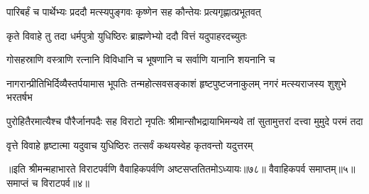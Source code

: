 \twolineshloka
{पारिबर्हं च पार्थेभ्यः प्रददौ मत्स्यपुङ्गवः}
{कृष्णेन सह कौन्तेयः प्रत्यगृह्णात्प्रभूतवत्}


\twolineshloka
{कृते विवाहे तु तदा धर्मपुत्रो युधिष्ठिरः}
{ब्राह्मणेभ्यो ददौ वित्तं यदुपाहरदच्युतः}


\twolineshloka
{गोसहस्राणि वस्त्राणि रत्नानि विविधानि च}
{भूषणानि च सर्वाणि यानानि शयनानि च}


\onelineshloka
{नागरान्प्रीतिभिर्दिव्यैस्तर्पयामास भूपतिः}
\twolineshloka
{तन्महोत्सवसङ्काशं हृष्टपुष्टजनाकुलम्}
{नगरं मत्स्यराजस्य शुशुभे भरतर्षभ}


\threelineshloka
{पुरोहितैरमात्यैश्च पौरैर्जानपदैः सह}
{विराटो नृपतिः श्रीमान्सौभद्रायाभिमन्यवे}
{तां सुतामुत्तरां दत्त्वा मुमुदे परमं तदा}




\twolineshloka
{वृत्ते विवाहे हृष्टात्मा यदुवाच युधिष्ठिरः}
{तत्सर्वं कथयस्वेह कृतवन्तो यदुत्तरम्}

॥इति श्रीमन्महाभारते विराटपर्वणि वैवाहिकपर्वणि अष्टसप्ततितमोऽध्यायः॥७८॥ वैवाहिकपर्व समाप्तम्॥५॥ समाप्तं च विराटपर्व॥४॥
